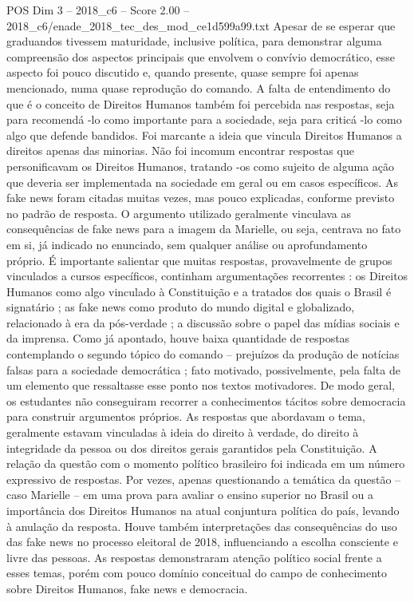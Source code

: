 \begin{textsample}{POS Dim 3 – 2018\_c6 – Score 2.00 – 2018\_c6/enade\_2018\_tec\_des\_mod\_ce1d599a99.txt}
Apesar de se esperar que graduandos tivessem maturidade, inclusive política, para demonstrar alguma compreensão dos aspectos principais que envolvem o convívio democrático, esse aspecto foi pouco discutido e, quando presente, quase sempre foi apenas mencionado, numa quase reprodução do comando.
A falta de entendimento do que é o conceito de Direitos Humanos também foi percebida nas respostas, seja para recomendá -lo como importante para a sociedade, seja para criticá -lo como algo que defende bandidos.
Foi marcante a ideia que vincula Direitos Humanos a direitos apenas das minorias.
Não foi incomum encontrar respostas que personificavam os Direitos Humanos, tratando -os como sujeito de alguma ação que deveria ser implementada na sociedade em geral ou em casos específicos.
As fake news foram citadas muitas vezes, mas pouco explicadas, conforme previsto no padrão de resposta.
O argumento utilizado geralmente vinculava as consequências de fake news para a imagem da Marielle, ou seja, centrava no fato em si, já indicado no enunciado, sem qualquer análise ou aprofundamento próprio.
É importante salientar que muitas respostas, provavelmente de grupos vinculados a cursos específicos, continham argumentações recorrentes : os Direitos Humanos como algo vinculado à Constituição e a tratados dos quais o Brasil é signatário ; as fake news como produto do mundo digital e globalizado, relacionado à era da pós-verdade ; a discussão sobre o papel das mídias sociais e da imprensa.
Como já apontado, houve baixa quantidade de respostas contemplando o segundo tópico do comando – prejuízos da produção de notícias falsas para a sociedade democrática ; fato motivado, possivelmente, pela falta de um elemento que ressaltasse esse ponto nos textos motivadores.
De modo geral, os estudantes não conseguiram recorrer a conhecimentos tácitos sobre democracia para construir argumentos próprios.
As respostas que abordavam o tema, geralmente estavam vinculadas à ideia do direito à verdade, do direito à integridade da pessoa ou dos direitos gerais garantidos pela Constituição.
A relação da questão com o momento político brasileiro foi indicada em um número expressivo de respostas.
Por vezes, apenas questionando a temática da questão – caso Marielle – em uma prova para avaliar o ensino superior no Brasil ou a importância dos Direitos Humanos na atual conjuntura política do país, levando à anulação da resposta.
Houve também interpretações das consequências do uso das fake news no processo eleitoral de 2018, influenciando a escolha consciente e livre das pessoas.
As respostas demonstraram atenção político social frente a esses temas, porém com pouco domínio conceitual do campo de conhecimento sobre Direitos Humanos, fake news e democracia.

\end{textsample}
